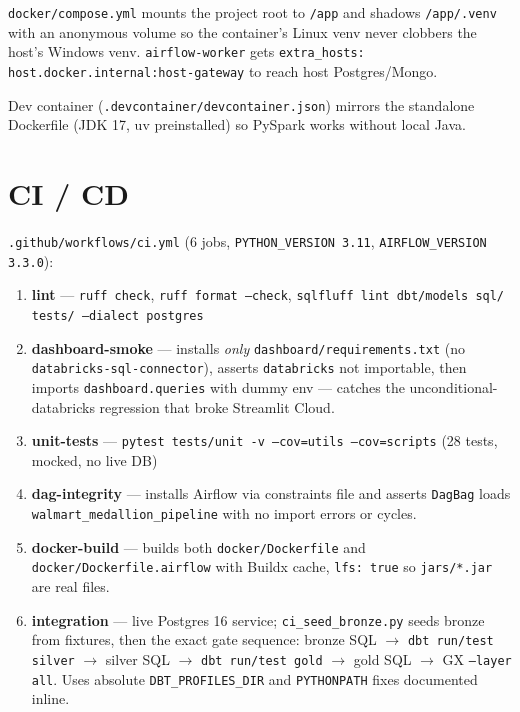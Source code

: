 \documentclass[11pt,a4paper]{article}
\begin{document}
\texttt{docker/compose.yml} mounts the project root to \texttt{/app} and shadows \texttt{/app/.venv} with an anonymous volume so the container's Linux venv never clobbers the host's Windows venv. \texttt{airflow-worker} gets \texttt{extra\_hosts: host.docker.internal:host-gateway} to reach host Postgres/Mongo.

Dev container (\texttt{.devcontainer/devcontainer.json}) mirrors the standalone Dockerfile (JDK 17, uv preinstalled) so PySpark works without local Java.

\section{CI / CD}

\texttt{.github/workflows/ci.yml} (6 jobs, \texttt{PYTHON\_VERSION 3.11}, \texttt{AIRFLOW\_VERSION 3.3.0}):

\begin{enumerate}[leftmargin=1.4em,itemsep=2pt]
  \item \textbf{lint} — \texttt{ruff check}, \texttt{ruff format --check}, \texttt{sqlfluff lint dbt/models sql/ tests/ --dialect postgres}
  \item \textbf{dashboard-smoke} — installs \emph{only} \texttt{dashboard/requirements.txt} (no \texttt{databricks-sql-connector}), asserts \texttt{databricks} not importable, then imports \texttt{dashboard.queries} with dummy env — catches the unconditional-databricks regression that broke Streamlit Cloud.
  \item \textbf{unit-tests} — \texttt{pytest tests/unit -v --cov=utils --cov=scripts} (28 tests, mocked, no live DB)
  \item \textbf{dag-integrity} — installs Airflow via constraints file and asserts \texttt{DagBag} loads \texttt{walmart\_medallion\_pipeline} with no import errors or cycles.
  \item \textbf{docker-build} — builds both \texttt{docker/Dockerfile} and \texttt{docker/Dockerfile.airflow} with Buildx cache, \texttt{lfs: true} so \texttt{jars/*.jar} are real files.
  \item \textbf{integration} — live Postgres 16 service; \texttt{ci\_seed\_bronze.py} seeds bronze from fixtures, then the exact gate sequence: bronze SQL $\rightarrow$ \texttt{dbt run/test silver} $\rightarrow$ silver SQL $\rightarrow$ \texttt{dbt run/test gold} $\rightarrow$ gold SQL $\rightarrow$ GX \texttt{--layer all}. Uses absolute \texttt{DBT\_PROFILES\_DIR} and \texttt{PYTHONPATH} fixes documented inline.
\end{enumerate}
\end{document}

